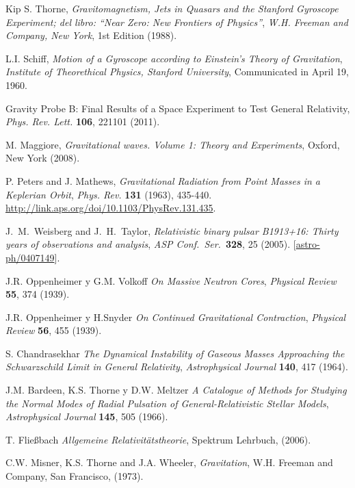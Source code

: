 \begin{thebibliography}{99}
Kip S. Thorne, {\it Gravitomagnetism, Jets in Quasars and the Stanford Gyroscope Experiment; del libro: ``Near Zero: New Frontiers of Physics''},
{\sl W.H. Freeman and Company, New York}, 1st Edition (1988).

L.I. Schiff, {\it Motion of a Gyroscope according to Einstein's Theory of Gravitation},
{\sl Institute of Theorethical Physics, Stanford University}, Communicated in April 19, 1960.



Gravity Probe B: Final Results of a Space Experiment to Test General Relativity, {\it Phys. Rev. Lett.} {\bf 106}, 221101 (2011).

 M. Maggiore, {\em  Gravitational waves. Volume 1: Theory and Experiments}, Oxford, New York (2008).

P. Peters and J. Mathews, {\em Gravitational Radiation from Point Masses in a Keplerian Orbit}, {\sl Phys. Rev.} {\bf 131} (1963), 435-440. \url{http://link.aps.org/doi/10.1103/PhysRev.131.435}.

 J.~M.~Weisberg and J.~H.~Taylor, {\em Relativistic binary pulsar B1913+16: Thirty years of observations and analysis}, {\sl ASP Conf.\ Ser.}\  {\bf 328}, 25 (2005). [\href{http://arxiv.org/abs/astro-ph/0407149}{astro-ph/0407149}].

 J.R. Oppenheimer y G.M. Volkoff {\em On Massive Neutron Cores}, {\sl Physical Review} {\bf 55}, 374 (1939).

 J.R. Oppenheimer y H.Snyder {\em On Continued Gravitational Contraction}, {\sl Physical Review} {\bf 56}, 455 (1939).

 S. Chandrasekhar {\em The Dynamical Instability of Gaseous Masses Approaching the Schwarzschild Limit in General Relativity}, {\sl Astrophysical Journal} {\bf 140}, 417 (1964).

 J.M. Bardeen, K.S. Thorne y D.W. Meltzer {\em A Catalogue of Methods for Studying the Normal Modes of Radial Pulsation of General-Relativistic Stellar Models}, {\sl Astrophysical Journal} {\bf 145}, 505 (1966).

 T. Flie\ss bach {\em Allgemeine Relativit\"atstheorie}, Spektrum Lehrbuch, (2006).

 C.W. Misner, K.S. Thorne and J.A. Wheeler, {\em Gravitation},
W.H. Freeman and Company, San Francisco, (1973).


\end{thebibliography}
